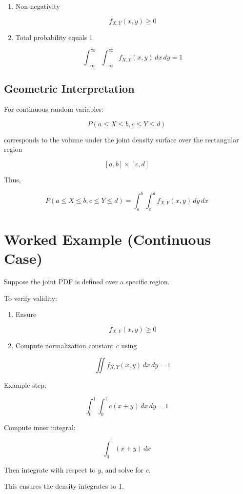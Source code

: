 \documentclass[12pt]{article}
\begin{document}
\begin{enumerate}
\item Non-negativity

\[
f_{X,Y}(x,y) \ge 0
\]

\item Total probability equals 1

\[
\int_{-\infty}^{\infty} \int_{-\infty}^{\infty} f_{X,Y}(x,y)\,dx\,dy = 1
\]

\end{enumerate}

\subsection{Geometric Interpretation}

For continuous random variables:

\[
P(a \le X \le b, c \le Y \le d)
\]

corresponds to the volume under the joint density surface over the rectangular region

\[
[a,b] \times [c,d]
\]

Thus,

\[
P(a \le X \le b, c \le Y \le d)
=
\int_a^b \int_c^d f_{X,Y}(x,y)\,dy\,dx
\]

\section{Worked Example (Continuous Case)}

Suppose the joint PDF is defined over a specific region.

To verify validity:

\begin{enumerate}
\item Ensure

\[
f_{X,Y}(x,y) \ge 0
\]

\item Compute normalization constant $c$ using

\[
\iint f_{X,Y}(x,y)\,dx\,dy = 1
\]

\end{enumerate}

Example step:

\[
\int_0^1 \int_0^1 c(x+y)\,dx\,dy = 1
\]

Compute inner integral:

\[
\int_0^1 (x+y)\,dx
\]

Then integrate with respect to $y$, and solve for $c$.

This ensures the density integrates to 1.
\end{document}
